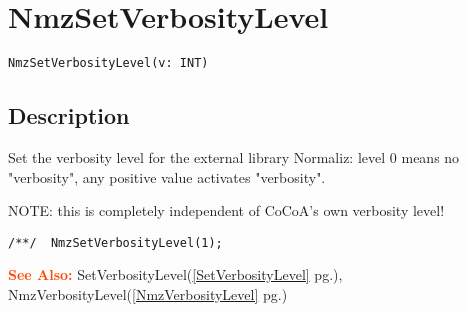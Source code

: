 \documentclass[a4paper]{mybook}
\newenvironment{command}{}{} %
\newcommand\SeeAlso{\par\textcolor{OrangeRed}{\textbf{\large See Also: }}}
\begin{document}
\section{NmzSetVerbosityLevel}
\label{NmzSetVerbosityLevel}
\begin{command} %


\begin{Verbatim}[label=syntax, rulecolor=\color{MidnightBlue},
frame=single]
NmzSetVerbosityLevel(v: INT)
\end{Verbatim}


\subsection*{Description}

Set the verbosity level for the external library Normaliz: level 0
means no "verbosity", any positive value activates "verbosity".
\par 
NOTE: this is completely independent of CoCoA's own verbosity level!
\begin{Verbatim}[label=example, rulecolor=\color{PineGreen}, frame=single]
/**/  NmzSetVerbosityLevel(1);
\end{Verbatim}


\SeeAlso %
  SetVerbosityLevel(\ref{SetVerbosityLevel} pg.\pageref{SetVerbosityLevel}), 
    NmzVerbosityLevel(\ref{NmzVerbosityLevel} pg.\pageref{NmzVerbosityLevel})
\end{command} %
\end{document}
